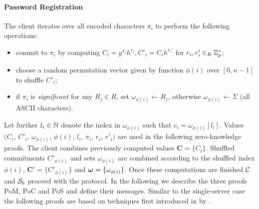 \paragraph{Password Registration}
The client iterates over all encoded characters $\pi_i$ to perform the following operations:
\begin{itemize}
  \item commit to $\pi_i$ by computing $C_i=g^{\pi_i}h^{r_i}, C'_i=C_i h^{r_i'}$ for $r_i,r'_i\in_R\mathbb{Z}^\ast_p$;
  \item choose a random permutation vector given by function $\phi(i)$ over $[0,n-1]$ to shuffle $C'_i$;
  \item if $\pi_i$ is \emph{significant} for any $R_j\in R$, set $\omega_{\phi(i)}\gets R_j$, otherwise $\omega_{\phi(i)}\gets\Sigma$ (all \ac{ASCII} characters).
\end{itemize}
Let further $l_i\in\mathbb{N}$ denote the index in $\omega_{\phi(i)}$ such that $c_i=\omega_{\phi(i)}[l_i]$.
Values $(C_i$, $C'_i$, $\omega_{\phi(i)}$, $\phi(i)$, $l_i$, $\pi_i$, $r_i$, $r'_i)$ are used in the following zero-knowledge proofs.
The client combines previously computed values $\bm C = \{C_{i}\}$.
Shuffled commitments $C'_{\phi(i)}$ and sets $\omega_{\phi(i)}$ are combined according to the shuffled index $\phi(i)$, \ie $\bm C' = \{C'_{\phi(i)}\}$ and $\boldsymbol{\mathbf{\omega}} = \{\omega_{\phi(i)}\}$.
Once these computations are finished $\mathcal{C}$ and $\mathcal{S}_b$ proceed with the protocol.
In the following we describe the three proofs \ac{PoM}, \ac{PoC} and \ac{PoS} and define their messages.
Similar to the single-server case the following proofs are based on techniques first introduced in by \citet{CramerDS94,Schnorr91,Chaum93}.

